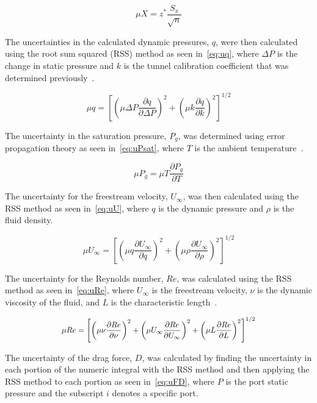\documentclass[journal,letterpaper]{IEEEtran}
\begin{document}
\begin{equation} \label{eq:conf}
    \mu X = z^* \frac{S_x}{\sqrt{n}}
\end{equation}

The uncertainties in the calculated dynamic pressures, $q$, were then calculated using the root sum squared (RSS) method as seen in~\eqref{eq:uq}, where $\Delta P$ is the change in static pressure and $k$ is the tunnel calibration coefficient that was determined previously~\cite{MoMLecture}.

\begin{equation} \label{eq:uq}
    \mu q = \left[\left(\mu \Delta P \frac{\partial q}{\partial \Delta P}\right)^2 + \left(\mu k \frac{\partial q}{\partial k}\right)^2\right]^{1/2}
\end{equation}

The uncertainty in the saturation pressure, $P_g$, was determined using error propagation theory as seen in~\eqref{eq:uPsat}, where $T$ is the ambient temperature~\cite{errorprop}.

\begin{equation} \label{eq:uPsat}
    \mu P_g = \mu T \frac{\partial P_g}{\partial T}
\end{equation}

The uncertainty for the freestream velocity, $U_\infty$, was then calculated using the RSS method as seen in~\eqref{eq:uU}, where $q$ is the dynamic pressure and $\rho$ is the fluid density.

\begin{equation} \label{eq:uU}
    \mu U_\infty = \left[\left(\mu q \frac{\partial U_\infty}{\partial q}\right)^2 + \left(\mu \rho \frac{\partial U_\infty}{\partial \rho}\right)^2\right]^{1/2}
\end{equation}

The uncertainty for the Reynolds number, $Re$, was calculated using the RSS method as seen in~\eqref{eq:uRe}, where $U_\infty$ is the freestream velocity, $\nu$ is the dynamic viscosity of the fluid, and $L$ is the characteristic length~\cite{HeatTrans}.

\begin{equation} \label{eq:uRe}
    \resizebox{227pt}{!}{$\displaystyle{\mu Re = \left[\left(\mu \nu \frac{\partial Re}{\partial \nu}\right)^2 + \left(\mu U_\infty \frac{\partial Re}{\partial U_\infty}\right)^2 + \left(\mu L \frac{\partial Re}{\partial L}\right)^2\right]^{1/2}}$}
\end{equation}

The uncertainty of the drag force, $D$, was calculated by finding the uncertainty in each portion of the numeric integral with the RSS method and then applying the RSS method to each portion as seen in~\eqref{eq:uFD}, where $P$ is the port static pressure and the subscript $i$ denotes a specific port.
\end{document}
